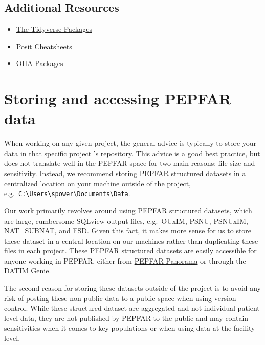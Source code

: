 \documentclass[
  letterpaper,
  DIV=11,
  numbers=noendperiod]{scrreprt}
\providecommand{\tightlist}{%
  \setlength{\itemsep}{0pt}\setlength{\parskip}{0pt}}\usepackage{longtable,booktabs,array}
\begin{document}
\hypertarget{additional-resources-2}{%
\section{Additional Resources}\label{additional-resources-2}}

\begin{itemize}
\tightlist
\item
  \href{https://www.tidyverse.org/}{The Tidyverse Packages}
\item
  \href{https://posit.co/resources/cheatsheets/}{Posit Cheatsheets}
\item
  \href{https://usaid-oha-si.github.io/tools/}{OHA Packages}
\end{itemize}


\hypertarget{storing-and-accessing-pepfar-data}{%
\chapter{Storing and accessing PEPFAR
data}\label{storing-and-accessing-pepfar-data}}

When working on any given project, the general advice is typically to
store your data in that specific project 's repository. This advice is a
good best practice, but does not translate well in the PEPFAR space for
two main reasons: file size and sensitivity. Instead, we recommend
storing PEPFAR structured datasets in a centralized location on your
machine outside of the project,
e.g.~\texttt{C:\textbackslash{}Users\textbackslash{}spower\textbackslash{}Documents\textbackslash{}Data}.

Our work primarily revolves around using PEPFAR structured datasets,
which are large, cumbersome SQLview output files, e.g.~OUxIM, PSNU,
PSNUxIM, NAT\_SUBNAT, and FSD. Given this fact, it makes more sense for
us to store these dataset in a central location on our machines rather
than duplicating these files in each project. These PEPFAR structured
datasets are easily accessible for anyone working in PEPFAR, either from
\href{https://pepfar-panorama.org/}{PEPFAR Panorama} or through the
\href{https://www.datim.org/}{DATIM Genie}.

The second reason for storing these datasets outside of the project is
to avoid any risk of posting these non-public data to a public space
when using version control. While these structured dataset are
aggregated and not individual patient level data, they are not published
by PEPFAR to the public and may contain sensitivities when it comes to
key populations or when using data at the facility level.
\end{document}

